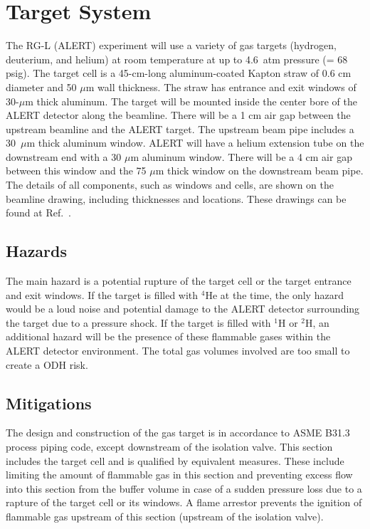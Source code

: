 \section{Target System}

The RG-L (ALERT) experiment will use a variety of gas targets (hydrogen, deuterium, and helium) at
room temperature at up to 4.6~atm pressure (= 68 psig). The target cell is a
45-cm-long aluminum-coated Kapton straw of 0.6 cm diameter and 50 $\mu$m wall thickness. The
straw has entrance and exit windows of 30-$\mu$m thick aluminum. The target will be mounted
inside the center bore of the ALERT detector along the beamline. There will be a 1 cm air gap
between the upstream beamline and the ALERT target. The upstream beam pipe includes a 30~$\mu$m
thick aluminum window. ALERT will have a helium extension tube on the downstream end with a
30 $\mu$m aluminum window. There will be a 4 cm air gap between this window and the 75 $\mu$m
thick window on the downstream beam pipe. The details of all components, such as windows and cells,
are shown on the beamline drawing, including thicknesses and locations. These drawings can be found
at Ref.~\cite{engineering-page}.

\subsection{Hazards} 

The main hazard is a potential rupture of the target cell or the target entrance and exit windows.
If the target is filled with $^4$He at the time, the only hazard would be a loud noise and potential
damage to the ALERT detector surrounding the target due to a pressure shock. If the target is filled
with $^1$H or $^2$H, an additional hazard will be the presence of these flammable gases within the
ALERT detector environment. The total gas volumes involved are too small to create a ODH risk.

\subsection{Mitigations}

The design and construction of the gas target is in accordance to ASME B31.3 process piping code, except
downstream of the isolation valve. This section includes the target cell and is qualified by equivalent
measures. These include limiting the amount of flammable gas in this section and preventing excess flow
into this section from the buffer volume in case of a sudden pressure loss due to a rapture of the target
cell or its windows. A flame arrestor prevents the ignition of flammable gas upstream of this section
(upstream of the isolation valve).

